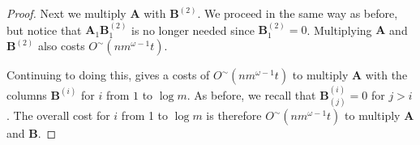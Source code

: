 \begin{proof}
Next we multiply $\mathbf{A}$ with $\mathbf{B}^{(2)}$. We proceed
in the same way as before, but notice that $\mathbf{A}_{1}\mathbf{B}_{1}^{(2)}$
is no longer needed since $\mathbf{B}_{1}^{(2)}=0$. Multiplying $\mathbf{A}$
and $\mathbf{B}^{(2)}$ also costs $O^{\sim}\left(nm^{\omega-1}t\right).$

Continuing to doing this, gives a costs of $O^{\sim}\left(nm^{\omega-1}t\right)$
to multiply $\mathbf{A}$ with the columns $\mathbf{B}^{(i)}$ for
$i$ from $1$ to $\log m$. As before, we recall that $\mathbf{B}_{(j)}^{(i)}=0$
for $j>i$. The overall cost for $i$ from 1 to $\log m$ is therefore
$O^{\sim}\left(nm^{\omega-1}t\right)$ to multiply $\mathbf{A}$ and
$\mathbf{B}$. \end{proof}

